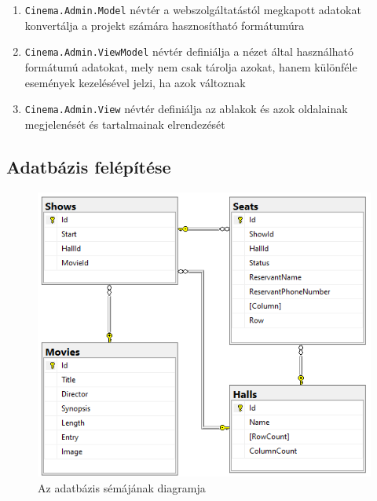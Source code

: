 \documentclass{article}
\begin{document}
\begin{itemize}
\begin{enumerate}
			\begin{enumerate}
				\item \texttt{Cinema.Admin.Model} névtér a webszolgáltatástól megkapott adatokat konvertálja a projekt számára hasznosítható formátumúra
				\item \texttt{Cinema.Admin.ViewModel} névtér definiálja a nézet által használható formátumú adatokat, mely nem csak tárolja azokat, hanem különféle események kezelésével jelzi, ha azok változnak
				\item \texttt{Cinema.Admin.View} névtér definiálja az ablakok és azok oldalainak megjelenését és tartalmainak elrendezését
			\end{enumerate}
		\end{enumerate}
	\end{itemize}
	\subsection*{Adatbázis felépítése}
	\begin{figure}[H]
		\centering
				\includegraphics[width=\textwidth]{database}
		\caption{Az adatbázis sémájának diagramja}
	\end{figure}
\end{document}
